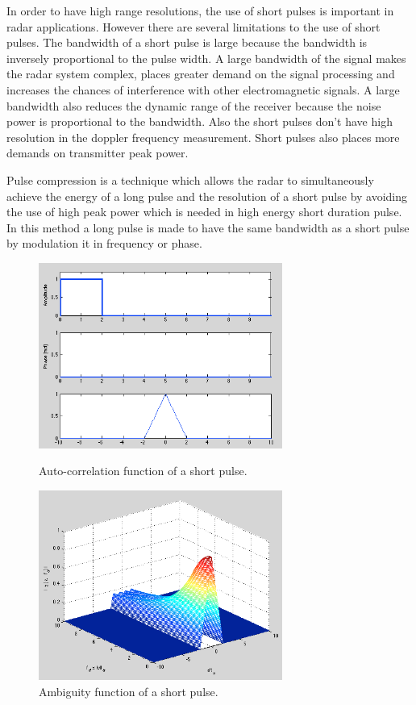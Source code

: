 \documentclass{article}
\begin{document}
In order to have high range resolutions, the use of short pulses is important in radar applications. However there are several limitations to the use of short pulses. The bandwidth of a short pulse is large because the bandwidth is inversely proportional to the pulse width. A large bandwidth of the signal makes the radar system complex, places greater demand on the signal processing and increases the chances of interference with other electromagnetic signals. A large bandwidth also reduces the dynamic range of the receiver because the noise power is proportional to the bandwidth. Also the short pulses don't have high resolution in the doppler frequency measurement. Short pulses also places more demands on transmitter peak power. 

Pulse compression is a technique which allows the radar to simultaneously achieve the energy of a long pulse and the resolution of a short pulse by avoiding the use of high peak power which is needed in high energy short duration pulse. In this method a long pulse is made to have the same bandwidth as a short pulse by modulation it in frequency or phase.


\begin{figure}[tbh]
\begin{minipage}[t]{0.5\linewidth}
\centering
\includegraphics[width=8cm]{Figures/short_pulse_data.png}
\caption{Auto-correlation function of a short pulse.}
\label{fig:short_pulse_data}
\end{minipage}
\begin{minipage}[t]{0.5\linewidth}
\centering
\includegraphics[width=8cm]{Figures/short_pulse_3d.png}
\caption{Ambiguity function of a short pulse.}
\label{fig:short_pulse_3d}
\end{minipage}
\end{figure}
\end{document}
